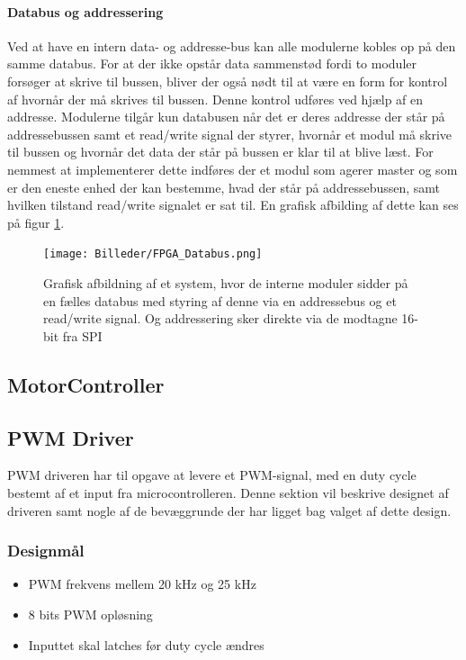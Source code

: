 \paragraph*{Databus og addressering}
Ved at have en intern data- og addresse-bus kan alle modulerne kobles op på den samme databus. For at der ikke opstår data sammenstød fordi to moduler forsøger at skrive til bussen, bliver der også nødt til at være en form for kontrol af hvornår der må skrives til bussen. Denne kontrol udføres ved hjælp af en addresse. Modulerne tilgår kun databusen når det er deres addresse der står på addressebussen samt et read/write signal der styrer, hvornår et modul må skrive til bussen og hvornår det data der står på bussen er klar til at blive læst. For nemmest at implementerer dette indføres der et modul som agerer master og som er den eneste enhed der kan bestemme, hvad der står på addressebussen, samt hvilken tilstand read/write signalet er sat til. En grafisk afbilding af dette kan ses på figur \ref{fig:FPGA_Databus}.

\begin{figure}[ht]
	\begin{center}
		\texttt{[image: Billeder/FPGA\_Databus.png]}
	\end{center}
\caption{Grafisk afbildning af et system, hvor de interne moduler sidder på en fælles databus med styring af denne via en addressebus og et read/write signal. Og addressering sker direkte via de modtagne 16-bit fra SPI}
\label{fig:FPGA_Databus}
\end{figure}

\subsection{MotorController}

\subsection{PWM Driver}

PWM driveren har til opgave at levere et PWM-signal, med en duty cycle bestemt af et input fra microcontrolleren. Denne sektion vil beskrive designet af driveren samt nogle af de bevæggrunde der har ligget bag valget af dette design.

\subsubsection{Designmål}

\begin{itemize}

\item PWM frekvens mellem 20 kHz og 25 kHz
\item 8 bits PWM opløsning
\item Inputtet skal latches før duty cycle ændres

\end{itemize}


